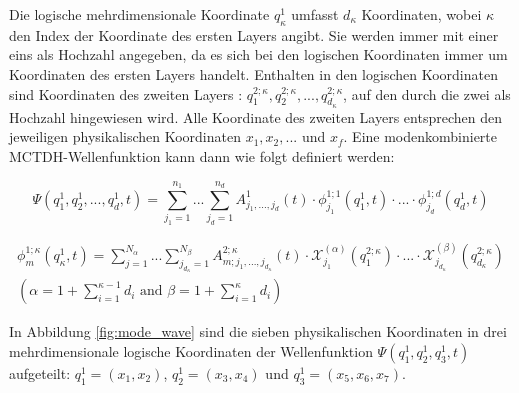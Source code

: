 Die logische mehrdimensionale Koordinate $ q^1_\kappa $ umfasst $d_\kappa $ Koordinaten, wobei $\kappa$ den Index der Koordinate des ersten Layers angibt.
Sie werden immer mit einer eins als Hochzahl angegeben, da es sich bei den logischen Koordinaten immer um Koordinaten des ersten Layers handelt.
Enthalten in den logischen Koordinaten sind Koordinaten des zweiten Layers : $  q^{2;\kappa}_1, q^{2;\kappa}_2, ..., q^{2;\kappa}_{d_\kappa} $, auf den durch die
zwei als Hochzahl hingewiesen wird. Alle Koordinate des zweiten Layers entsprechen den jeweiligen physikalischen Koordinaten $x_{1}, x_{2}, ...$ und $x_{f}$.
Eine modenkombinierte MCTDH-Wellenfunktion kann dann wie folgt definiert werden:

\begin{equation}
 \Psi(q^{1}_{1},q^{1}_{2},..., q^{1}_{d}, t)=\sum^{n_{1}}_{j_{1}=1} ... \sum^{n_{d}}_{j_{d}=1} A^{1}_{j_{1}, ..., j_{d}}(t)
 \cdot \phi^{1;1}_{j_{1}}(q^1_{1}, t) \cdot ... \cdot \phi^{1;d}_{j_{d}}(q^1_{d}, t)
 \label{Eq:mode_comb_wave}
 \end{equation}

\begin{equation}
  \begin{gathered}
 \phi^{1;\kappa}_{m} (q^1_{\kappa}, t)=\sum^{N_{\alpha}}_{j=1} ... \sum^{N_{\beta}}_{j_{d_\kappa}=1} A^{2;\kappa}_{m;j_1,...,j_{d_\kappa}}(t)
 \cdot \mathcal{X}^{(\alpha)}_{j_1}(q^{2;\kappa}_1) \cdot ... \cdot
 \mathcal{X}^{(\beta)}_{j_{d_\kappa}}(q^{2;\kappa}_{d_\kappa})\\
 \left( \alpha = 1 + \sum^{\kappa - 1}_{i=1}d_i \text{ and }  \beta = 1 + \sum^{\kappa}_{i=1}d_i\right)
 \label{Eq:mode_SPF}
\end{gathered}
 \end{equation}

In Abbildung \ref{fig:mode_wave} sind die sieben physikalischen
Koordinaten in drei mehrdimensionale logische Koordinaten der Wellenfunktion $ \Psi(q^{1}_{1},q^{1}_{2},q^{1}_{3}, t)$ aufgeteilt: $q^{1}_{1} = \left(x_1, x_2 \right)$, $ q^{1}_{2} = \left(x_3, x_4 \right)$
und $ q^{1}_{3} = \left(x_5, x_6, x_7 \right)$.


